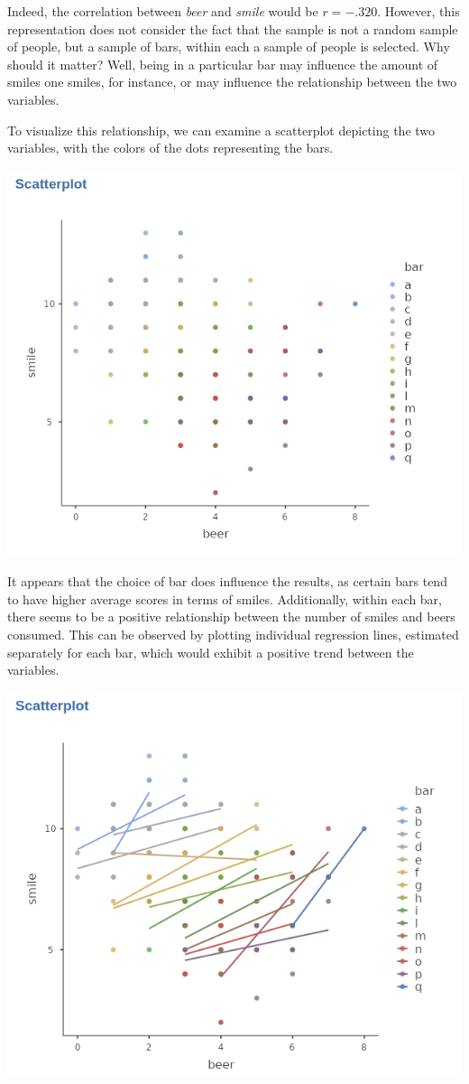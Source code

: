 \documentclass[
]{book}
\begin{document}
Indeed, the correlation between \emph{beer} and \emph{smile} would be \(r=-.320\). However, this representation does not consider the fact that the sample is not a random sample of people, but a sample of bars, within each a sample of people is selected. Why should it matter? Well, being in a particular bar may influence the amount of smiles one smiles, for instance, or may influence the relationship between the two variables.

To visualize this relationship, we can examine a scatterplot depicting the two variables, with the colors of the dots representing the bars.

\includegraphics[width=0.8\linewidth]{bookletpics/4_theory_plot2}

It appears that the choice of bar does influence the results, as certain bars tend to have higher average scores in terms of smiles. Additionally, within each bar, there seems to be a positive relationship between the number of smiles and beers consumed. This can be observed by plotting individual regression lines, estimated separately for each bar, which would exhibit a positive trend between the variables.

\includegraphics[width=0.8\linewidth]{bookletpics/4_theory_plot3}
\end{document}
